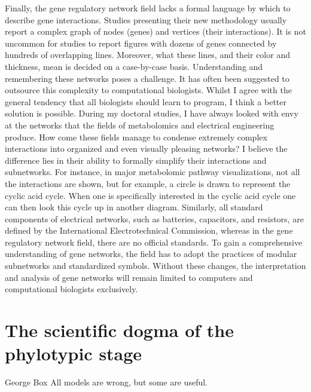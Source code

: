 Finally, the gene regulatory network field lacks a formal language by which to describe gene interactions\cite{Lazebnik2002}. Studies presenting their new methodology usually report a complex graph of nodes (genes) and vertices (their interactions)\cite{Xu_2020,Aibar_2017,Margolin_2006,Glass_2013,Chan_2017,Jiang_2021,Kamimoto_2020,Woodhouse_2018,Rubiolo_2017}. It is not uncommon for studies to report figures with dozens of genes connected by hundreds of overlapping lines. Moreover, what these lines, and their color and thickness, mean is decided on a case-by-case basis. Understanding and remembering these networks poses a challenge. It has often been suggested to outsource this complexity to computational biologists\cite{Lazebnik2002,Bray2001,Markowetz2017}. Whilst I agree with the general tendency that all biologists should learn to program, I think a better solution is possible. During my doctoral studies, I have always looked with envy at the networks that the fields of metabolomics and electrical engineering produce. How come these fields manage to condense extremely complex interactions into organized and even visually pleasing networks? I believe the difference lies in their ability to formally simplify their interactions and subnetworks. For instance, in major metabolomic pathway visualizations, not all the interactions are shown, but for example, a circle is drawn to represent the cyclic acid cycle. When one is specifically interested in the cyclic acid cycle one can then look this cycle up in another diagram. Similarly, all standard components of electrical networks, such as batteries, capacitors, and resistors, are defined by the International Electrotechnical Commission\cite{IEC}, whereas in the gene regulatory network field, there are no official standards. To gain a comprehensive understanding of gene networks, the field has to adopt the practices of modular subnetworks and standardized symbols. Without these changes, the interpretation and analysis of gene networks will remain limited to computers and computational biologists exclusively.

\section{The scientific dogma of the phylotypic stage}

\begin{shadequote}[c]{George Box}
All models are wrong, but some are useful.
\end{shadequote}

